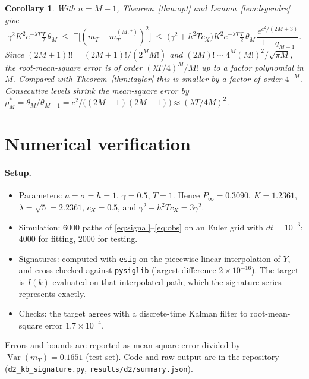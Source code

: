 \documentclass[11pt]{article}
\newtheorem{corollary}[theorem]{Corollary}
\theoremstyle{remark}
\newcommand{\E}{\mathbb{E}}
\begin{document}
\begin{corollary}\label{cor:rate}
With $n=M-1$, Theorem~\ref{thm:opt} and Lemma~\ref{lem:legendre} give
\[
  \gamma^2K^2e^{-\lambda T}\tfrac T2\,\theta_M\;\le\;\E\big[(m_T-m^{(M,*)}_T)^2\big]\;\le\;
  \big(\gamma^2+h^2Tc_X\big)K^2e^{-\lambda T}\tfrac T2\,\theta_M\,\frac{e^{c^2/(2M+3)}}{1-q_{M-1}} .
\]
Since $(2M+1)!!=(2M+1)!/(2^MM!)$ and $(2M)!\sim4^M(M!)^2/\sqrt{\pi M}$, the root-mean-square
error is of order $(\lambda T/4)^M/M!$ up to a factor polynomial in $M$. Compared with
Theorem~\ref{thm:taylor} this is smaller by a factor of order $4^{-M}$. Consecutive levels shrink
the mean-square error by $\rho^{*}_M=\theta_M/\theta_{M-1}=c^2/\big((2M-1)(2M+1)\big)\approx(\lambda T/4M)^2$.
\end{corollary}

\section{Numerical verification}\label{sec:numerics}

\paragraph{Setup.}
\begin{itemize}
  \item Parameters: $a=\sigma=h=1$, $\gamma=0.5$, $T=1$. Hence $P_\infty=0.3090$, $K=1.2361$,
        $\lambda=\sqrt5=2.2361$, $c_X=0.5$, and $\gamma^2+h^2Tc_X=3\gamma^2$.
  \item Simulation: $6000$ paths of \eqref{eq:signal}--\eqref{eq:obs} on an Euler grid with
        $dt=10^{-3}$; $4000$ for fitting, $2000$ for testing.
  \item Signatures: computed with \texttt{esig} on the piecewise-linear interpolation of $Y$, and
        cross-checked against \texttt{pysiglib} (largest difference $2\times10^{-16}$). The target
        is $I(k)$ evaluated on that interpolated path, which the signature series represents exactly.
  \item Checks: the target agrees with a discrete-time Kalman filter to root-mean-square error
        $1.7\times10^{-4}$.
\end{itemize}
Errors and bounds are reported as mean-square error divided by $\operatorname{Var}(m_T)=0.1651$ (test set).
Code and raw output are in the repository (\texttt{d2\_kb\_signature.py},
\texttt{results/d2/summary.json}).
\end{document}
